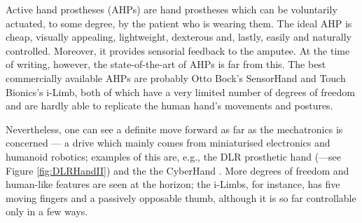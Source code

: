 Active hand prostheses (AHPs) are hand prostheses which can be
voluntarily actuated, to some degree, by the patient who is wearing
them. The ideal AHP is cheap, visually appealing, lightweight,
dexterous and, lastly, easily and naturally controlled. Moreover, it
provides sensorial feedback to the amputee. At the time of writing,
however, the state-of-the-art of AHPs is far from this. The best
commercially available AHPs are probably Otto Bock's SensorHand and
Touch Bionics's i-Limb, both of which have a very limited number of
degrees of freedom and are hardly able to replicate the human hand's
movements and postures.

Nevertheless, one can see a definite move forward as far as the
mechatronics is concerned --- a drive which mainly comes from
miniaturised electronics and humanoid robotics; examples of this are,
e.g., the DLR prosthetic hand (\cite{Hua2006}---see Figure
\ref{fig:DLRHandII}) and the the CyberHand \cite{cyberhand}. More
degrees of freedom and human-like features are seen at the horizon;
the i-Limbs, for instance, has five moving fingers and a passively
opposable thumb, although it is so far controllable only in a few
ways.

